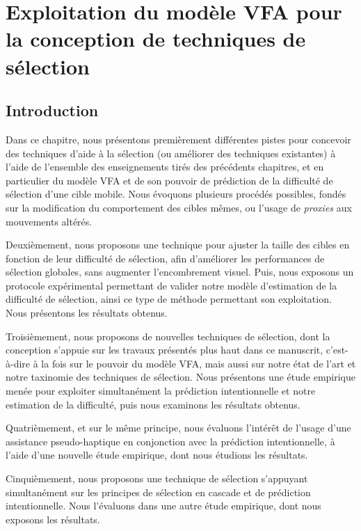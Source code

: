 
\chapter[Exploitation de VFA pour l'aide à la sélection]{Exploitation du modèle VFA pour la conception de techniques de sélection}
\minitoc
\label{chap5}
\clearpage

\section{Introduction}
	Dans ce chapitre, nous présentons premièrement différentes pistes pour concevoir des techniques d'aide à la sélection (ou améliorer des techniques existantes) à l'aide de l'ensemble des enseignements tirés des précédents chapitres, et en particulier du modèle VFA et de son pouvoir de prédiction de la difficulté de sélection d'une cible mobile. Nous évoquons plusieurs procédés possibles, fondés sur la modification du comportement des cibles mêmes, ou l'usage de \emph{proxies} aux mouvements altérés.
	
	Deuxièmement, nous proposons une technique pour ajuster la taille des cibles en fonction de leur difficulté de sélection, afin d'améliorer les performances de sélection globales, sans augmenter l'encombrement visuel. Puis, nous exposons un protocole expérimental permettant de valider notre modèle d'estimation de la difficulté de sélection, ainsi ce type de méthode permettant son exploitation. Nous présentons les résultats obtenus.
	
	Troisièmement, nous proposons de nouvelles techniques de sélection, dont la conception s'appuie sur les travaux présentés plus haut dans ce manuscrit, c'est-à-dire à la fois sur le pouvoir du modèle VFA, mais aussi sur notre état de l'art et notre taxinomie des techniques de sélection. Nous présentons une étude empirique menée pour exploiter simultanément la prédiction intentionnelle et notre estimation de la difficulté, puis nous examinons les résultats obtenus.
	
	Quatrièmement, et sur le même principe, nous évaluons l'intérêt de l'usage d'une assistance pseudo-haptique en conjonction avec la prédiction intentionnelle, à l'aide d'une nouvelle étude empirique, dont nous étudions les résultats.
	
	Cinquièmement, nous proposons une technique de sélection s'appuyant simultanément sur les principes de sélection en cascade et de prédiction intentionnelle. Nous l'évaluons dans une autre étude empirique, dont nous exposons les résultats.
	
